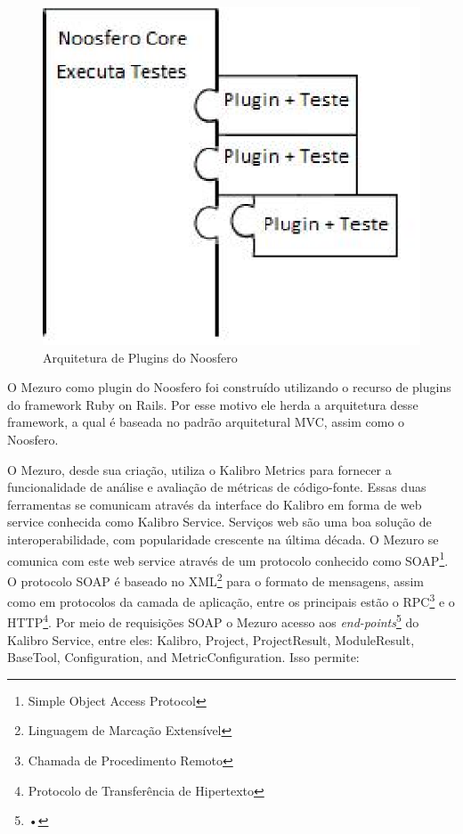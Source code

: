 \graphicspath{{figuras/}}
\begin{figure}[H]
\centering
\includegraphics{plugins}
\caption{Arquitetura de Plugins do Noosfero}
\label{Rotulo}
\end{figure}

O Mezuro como plugin do Noosfero foi construído utilizando o recurso de plugins do framework Ruby on Rails. Por esse motivo ele herda a arquitetura desse framework, a qual é baseada no padrão arquitetural MVC, assim como o Noosfero.

O Mezuro, desde sua criação, utiliza o Kalibro Metrics para fornecer a funcionalidade de análise e avaliação de métricas de código-fonte. Essas duas ferramentas se comunicam através da interface do Kalibro em forma de web service conhecida como Kalibro Service. Serviços web são uma boa solução de interoperabilidade, com popularidade crescente na última década. O Mezuro se comunica com este web service através de um protocolo conhecido como SOAP\footnote{Simple Object Access Protocol}. O protocolo SOAP é baseado no XML\footnote{Linguagem de Marcação Extensível} para o formato de mensagens, assim como em protocolos da camada de aplicação, entre os principais estão o RPC\footnote{Chamada de Procedimento Remoto} e o HTTP\footnote{Protocolo de Transferência de Hipertexto}. Por meio de requisições SOAP o Mezuro acesso aos \textit{end-points}\footnote{•} do Kalibro Service, entre eles: Kalibro, Project, ProjectResult, ModuleResult, BaseTool, Configuration, and MetricConfiguration. Isso permite:

